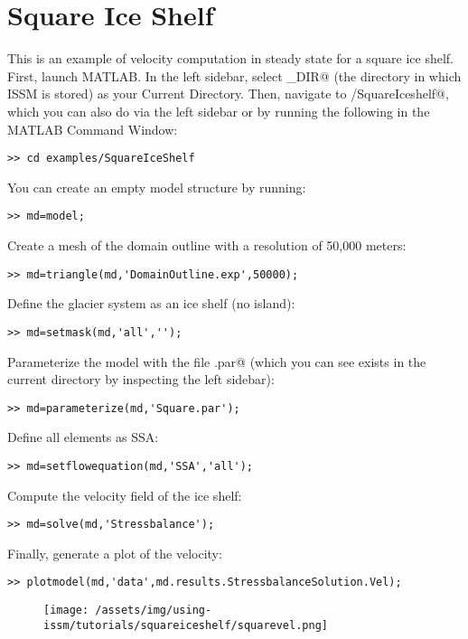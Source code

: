 \section{Square Ice Shelf}
This is an example of velocity computation in steady state for a square ice shelf. First, launch MATLAB. In the left sidebar, select \verb@ISSM_DIR@ (the directory in which ISSM is stored) as your Current Directory. Then, navigate to \verb@examples/SquareIceshelf@, which you can also do via the left sidebar or by running the following in the MATLAB Command Window:
\begin{verbatim}>> cd examples/SquareIceShelf\end{verbatim}

You can create an empty model structure by running:
\begin{verbatim}>> md=model;\end{verbatim}

Create a mesh of the domain outline with a resolution of 50,000 meters:
\begin{verbatim}>> md=triangle(md,'DomainOutline.exp',50000);\end{verbatim}

Define the glacier system as an ice shelf (no island):
\begin{verbatim}>> md=setmask(md,'all','');\end{verbatim}

Parameterize the model with the file \verb@Square.par@ (which you can see exists in the current directory by inspecting the left sidebar):
\begin{verbatim}>> md=parameterize(md,'Square.par');\end{verbatim}

Define all elements as SSA:
\begin{verbatim}>> md=setflowequation(md,'SSA','all');\end{verbatim}

Compute the velocity field of the ice shelf:
\begin{verbatim}>> md=solve(md,'Stressbalance');\end{verbatim}

Finally, generate a plot of the velocity:
\begin{verbatim}>> plotmodel(md,'data',md.results.StressbalanceSolution.Vel);\end{verbatim}

\begin{figure}[H]
	\begin{center}
		\texttt{[image: /assets/img/using-issm/tutorials/squareiceshelf/squarevel.png]}
	\end{center}
\end{figure}
